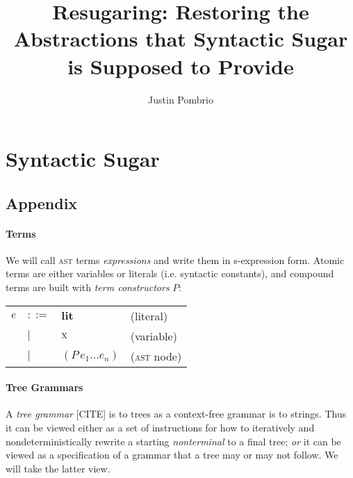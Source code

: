 \documentclass[
  11pt,
  paper=letter,
  footinclude=true,
  headinclude=true,
  american
]{scrbook}
\makeatletter
\newenvironment{jtable}
{\begin{center}\begin{tabular}{l l l @{\quad}l}}
{\end{tabular}\end{center}}
\newcommand{\lit}[1]{\textbf{#1}}
\newcommand{\expr}[2]{(#1\,#2)}
\newcommand{\var}[1]{\textrm{\textsc{#1}}}
\makeatother
\begin{document}
\author{Justin Pombrio}
\title{Resugaring: Restoring the Abstractions that Syntactic Sugar is Supposed to Provide}
\maketitle

\part{Syntactic Sugar}









\chapter{Appendix}

\subsection{Terms}

We will call \textsc{ast} terms \emph{expressions} and write them in
s-expression form. Atomic terms are either variables or literals
(i.e. syntactic constants), and compound terms are built with
\emph{term constructors} $P$:

\begin{jtable}
  $e$
  &$::=$& $\lit{lit}$ &(literal) \\
  &$|$&   $\var{x}$ &(variable) \\
  &$|$&   $\expr{P}{e_1 ... e_n}$ &(\textsc{ast} node)
\end{jtable}

\subsection{Tree Grammars}

A \emph{tree grammar} [CITE] is to trees as a context-free grammar is
to strings. Thus it can be viewed either as a set of instructions for
how to iteratively and nondeterministically rewrite a starting
\emph{nonterminal} to a final tree; \emph{or} it can be viewed as a
specification of a grammar that a tree may or may not follow. We will
take the latter view.
\end{document}
